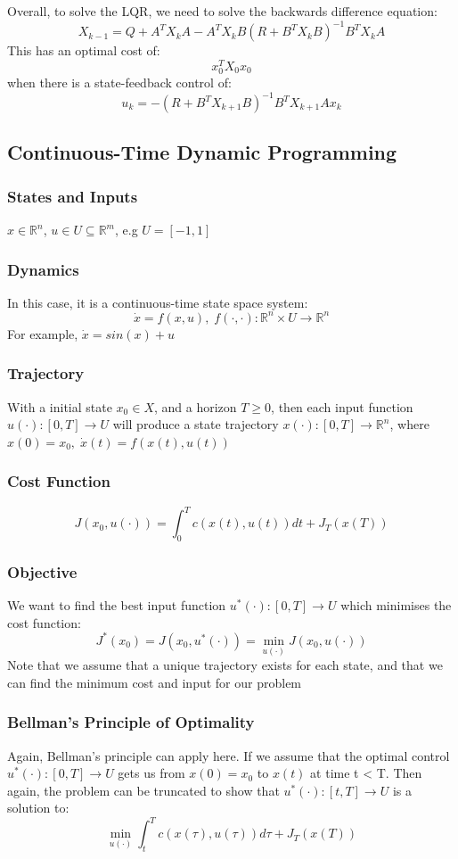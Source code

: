 \documentclass{article}
\begin{document}
Overall, to solve the LQR, we need to solve the backwards difference equation:
\[
X_{k-1} = Q + A^T X_k A - A^T X_kB(R + B^TX_k B)^{-1} B^T X_k A
\]
This has an optimal cost of:
\[
x_0^TX_0x_0
\]
when there is a state-feedback control of:
\[
u_k = -(R + B^T X_{k+1}B)^{-1}B^TX_{k+1}Ax_k
\]
\subsection{Continuous-Time Dynamic Programming}
\subsubsection*{States and Inputs}
$x \in \mathbb{R}^n$, $u \in U \subseteq \mathbb{R}^m $, e.g $U = [-1,1]$
\subsubsection*{Dynamics}
In this case, it is a continuous-time state space system:
\[
\dot x = f(x,u), \; f(\cdot, \cdot) : \mathbb{R}^n \times U \rightarrow \mathbb{R}^n
\]
For example, $\dot x = sin(x) + u$
\subsubsection*{Trajectory}
With a initial state $x_0 \in X$, and a horizon $T \geq 0$, then each input function $u (\cdot) : [0,T] \rightarrow U$ will produce a state trajectory $x(\cdot) : [0,T] \rightarrow \mathbb{R}^n $, where $x(0) = x_0, \; \dot x(t) = f(x(t),u(t))$
\subsubsection*{Cost Function}
\[
J(x_0,u( \cdot)) = \int_0^T c(x(t),u(t)) dt + J_T(x(T))
\]
\subsubsection*{Objective}
We want to find the best input function $u^*(\cdot) : [0,T] \rightarrow U$ which minimises the cost function:
\[
J^*(x_0) = J(x_0,u^*(\cdot)) = \min_{u (\cdot)} J(x_0,u(\cdot))
\]
Note that we assume that a unique trajectory exists for each state, and that we can find the minimum cost and input for our problem
\subsubsection*{Bellman's Principle of Optimality}
Again, Bellman's principle can apply here. If we assume that the optimal control $u^*(\cdot) : [0,T] \rightarrow U$ gets us from $x(0) = x_0$ to $x(t)$ at time t < T. Then again, the problem can be truncated to show that $u^*(\cdot) : [t,T] \rightarrow U$ is a solution to:
\[
\min_{u (\cdot)} \int_t^T c(x(\tau),u(\tau)) d \tau + J_T(x(T))
\]
\end{document}
